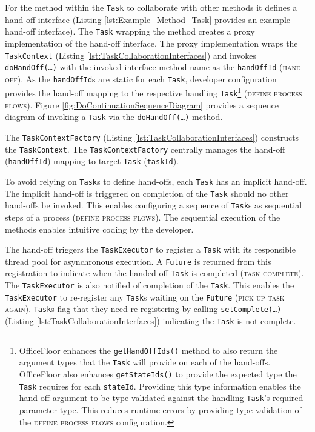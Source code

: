 \documentclass[prodmode]{style/acmlarge}
\begin{document}
For the method within the \texttt{Task} to collaborate with other methods it
defines a hand-off interface (Listing \ref{lst:Example_Method_Task} provides an
example hand-off interface).  The \texttt{Task} wrapping the method creates a
proxy implementation of the hand-off interface.  The proxy implementation wraps
the \texttt{TaskContext} (Listing \ref{lst:TaskCollaborationInterfaces}) and
invokes \texttt{doHandOff(\ldots)} with the invoked interface method name as the
\texttt{handOffId} (\textsc{hand-off}).  As the \texttt{handOffId}s are static
for each \texttt{Task}, developer configuration provides the hand-off mapping to
the respective handling \texttt{Task}\footnote{OfficeFloor enhances the
\texttt{getHandOffIds()} method to also return the argument types that the
\texttt{Task} will provide on each of the hand-offs.  OfficeFloor also enhances
\texttt{getStateIds()} to provide the expected type the \texttt{Task} requires
for each \texttt{stateId}. Providing this type information enables the hand-off
argument to be type validated against the handling \texttt{Task}'s required
parameter type.  This reduces runtime errors by providing type validation of the
\textsc{define process flows} configuration.} (\textsc{define process flows}). 
Figure \ref{fig:DoContinuationSequenceDiagram} provides a sequence diagram of
invoking a \texttt{Task} via the \texttt{doHandOff(\ldots)} method.

The \texttt{TaskContextFactory} (Listing \ref{lst:TaskCollaborationInterfaces})
constructs the \texttt{TaskContext}.  The \texttt{TaskContextFactory} centrally
manages the hand-off (\texttt{handOffId}) mapping to target \texttt{Task}
(\texttt{taskId}).

To avoid relying on \texttt{Task}s to define hand-offs, each \texttt{Task} has
an implicit hand-off.  The implicit hand-off is triggered on completion of the
\texttt{Task} should no other hand-offs be invoked.  This enables configuring a
sequence of \texttt{Task}s as sequential steps of a process (\textsc{define
process flows}).  The sequential execution of the methods enables intuitive
coding by the developer.

The hand-off triggers the \texttt{TaskExecutor} to register a \texttt{Task} with
its responsible thread pool for asynchronous execution.  A \texttt{Future} is
returned from this registration to indicate when the handed-off \texttt{Task} is
completed (\textsc{task complete}).  The \texttt{TaskExecutor} is also notified
of completion of the \texttt{Task}.  This enables the \texttt{TaskExecutor} to
re-register any \texttt{Task}s waiting on the \texttt{Future} (\textsc{pick up
task again}).  \texttt{Task}s flag that they need re-registering by calling
\texttt{setComplete(\ldots)} (Listing \ref{lst:TaskCollaborationInterfaces})
indicating the \texttt{Task} is not complete.
\end{document}
